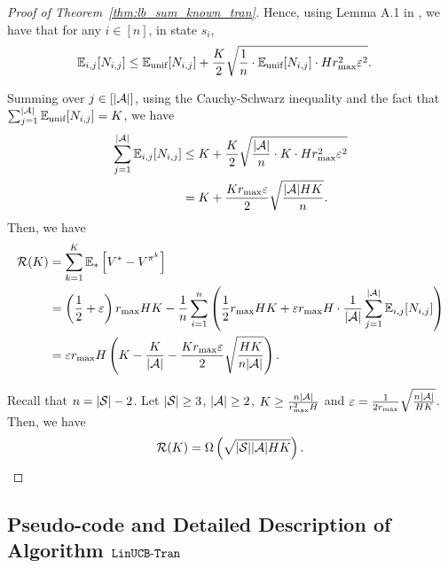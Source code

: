 \begin{proof}[Proof of Theorem~\ref{thm:lb_sum_known_tran}]
	Hence, using Lemma A.1 in \cite{auer2002nonstochastic}, we have that for any $i \in [n]$, in state $s_i$,
	\begin{align*}
		\mathbb{E}_{i,j}[N_{i,j}] &\leq  \mathbb{E}_{\textup{unif}}[N_{i,j}] + \frac{K}{2} \sqrt{ \frac{1}{n} \cdot \mathbb{E}_{\textup{unif}}[N_{i,j}] \cdot H r_{\max}^2 \varepsilon^2 } .
	\end{align*}
	
	Summing over $j \in [|\mathcal{A}|]$, using the Cauchy-Schwarz inequality and the fact that $\sum_{j=1}^{|\mathcal{A}|} \mathbb{E}_{\textup{unif}}[N_{i,j}]=K$, we have
	\begin{align*}
		\sum_{j=1}^{|\mathcal{A}|}  \mathbb{E}_{i,j}[N_{i,j}] &\leq K + \frac{K}{2} \sqrt{ \frac{|\mathcal{A}|}{n} \cdot K \cdot H r_{\max}^2 \varepsilon^2 } 
		\\
		&= K + \frac{K r_{\max} \varepsilon}{2} \sqrt{ \frac{|\mathcal{A}|HK}{n} } .
	\end{align*}
	Then, we have
	\begin{align*}
		\mathcal{R}(K) &= \sum_{k=1}^{K} \mathbb{E}_{*}\left[ V^*-V^{\pi^k} \right]
		\\
		&=\left( \frac{1}{2}+\varepsilon \right) r_{\max}HK - \frac{1}{n} \sum_{i=1}^{n} \left(  \frac{1}{2}r_{\max}HK + \varepsilon r_{\max} H \cdot \frac{1}{|\mathcal{A}|} \sum_{j=1}^{|\mathcal{A}|} \mathbb{E}_{i,j}[N_{i,j}]  \right)
		\\
		&= \varepsilon r_{\max} H \left( K - \frac{K}{|\mathcal{A}|} - \frac{K r_{\max} \varepsilon}{2} \sqrt{ \frac{HK}{n |\mathcal{A}|} }  \right) .
	\end{align*}
	
	Recall that $n=|\mathcal{S}|-2$.
	Let $|\mathcal{S}| \geq 3$, $|\mathcal{A}|\geq 2$, $K\geq \frac{n |\mathcal{A}|}{r_{\max}^2 H}$ and $\varepsilon=\frac{1}{2r_{\max}}\sqrt{\frac{n |\mathcal{A}|}{HK}}$. Then, we have 
	\begin{align*}
		\mathcal{R}(K) 
		=\Omega\left(  \sqrt{|\mathcal{S}||\mathcal{A}|HK}  \right) .
	\end{align*}
\end{proof}

\subsection{Pseudo-code and Detailed Description of Algorithm $\mathtt{LinUCB\mbox{-}Tran}$} \label{apx:alg_sum_unknown_tran}

